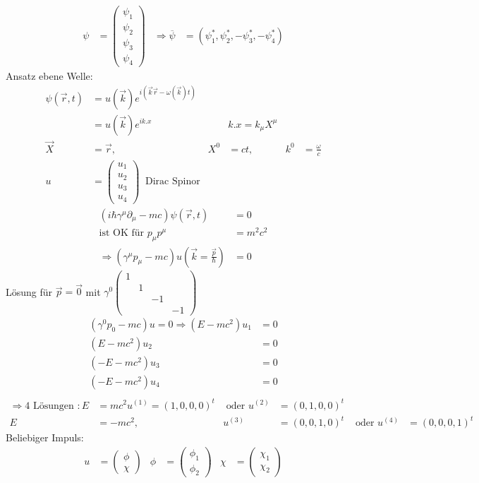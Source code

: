 	\begin{align*}
		\psi &=
		\begin{pmatrix}
			\psi_1 \\
			\psi_2 \\
			\psi_3 \\
			\psi_4
		\end{pmatrix}
		&\Rightarrow \overline{\psi} &=
		(\psi_1^*, \psi_2^*, -\psi_3^*, -\psi_4^*) 
	\end{align*}
Ansatz ebene Welle:
	\begin{align*}
		\psi (\vec{r}, t) &=
		u(\vec{k}) e^{i(\vec{k}\vec{r} - \omega(\vec{k}) t)} \\
		&= u(\vec{k}) e^{ik.x} 
		& &k. x= k_\mu X^\mu \\
		\vec{X} &= \vec{r} ,& X^0 &= ct,& k^0 &= \frac{\omega}{c} \\
		u &=
		\begin{pmatrix}
			u_1 \\
			u_2 \\
			u_3 \\
			u_4
		\end{pmatrix}
		~ \text{ Dirac Spinor}
	\end{align*}
	\begin{align*}
		\left(i \hbar \gamma^\mu \partial_\mu - mc\right)
		\psi(\vec{r}, t) &= 0 \\
		\text{ist OK für } p_\mu p^\mu &= m^2 c^2 \\
		\Rightarrow (\gamma^\mu p_\mu - mc) u \left(\vec{k} = \frac{\vec{p}}{\hbar}\right) &= 0 
	\end{align*}
Lösung für $\vec{p} = \vec{0}$ mit 
$ \gamma^0\begin{pmatrix}
1 & & \\
& 1 && \\
&& -1 & \\
&&& -1 
\end{pmatrix}$
	\begin{align*}
		(\gamma^0 p_0 - mc) u = 0 \Rightarrow
		(E-mc^2) u_1 &= 0 \\
		(E-mc^2) u_2 &= 0 \\
		(-E-mc^2) u_3 &= 0 \\
		(-E-mc^2) u_4 &= 0 \\
	\end{align*}
	\begin{align*}
		\Rightarrow 4 \text{ Lösungen }: 
		E &= mc^2 u^{(1)} = (1, 0 ,0 ,0)^t &\text{ oder } 
		u^{(2)} &= (0,1,0,0)^t \\
		E &= -mc^2 ,& u^{(3)} &= (0, 0, 1, 0)^t &\text{ oder }
		u^{(4)} &= (0,0,0,1)^t
	\end{align*}
Beliebiger Impuls:
	\begin{align*}
	u &= 
		\begin{pmatrix}
			\phi \\
			\chi
		\end{pmatrix} &
	\phi &= 
		\begin{pmatrix}
		\phi_1 \\
		\phi_2
		\end{pmatrix} &
	\chi &= 
		\begin{pmatrix}
		\chi_1 \\
		\chi_2
		\end{pmatrix}
	\end{align*}
